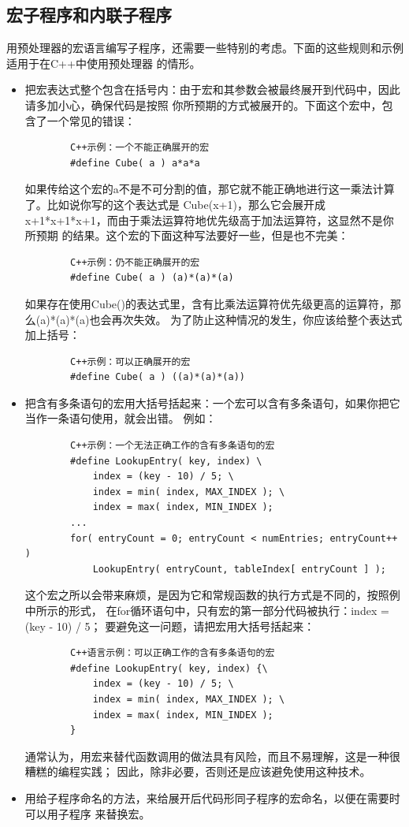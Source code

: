 \documentclass{article}
\begin{document}
\subsection{宏子程序和内联子程序}
用预处理器的宏语言编写子程序，还需要一些特别的考虑。下面的这些规则和示例适用于在C++中使用预处理器
的情形。
\begin{itemize}
    \item 把宏表达式整个包含在括号内：由于宏和其参数会被最终展开到代码中，因此请多加小心，确保代码是按照
    你所预期的方式被展开的。下面这个宏中，包含了一个常见的错误：
    \begin{lstlisting}
        C++示例：一个不能正确展开的宏
        #define Cube( a ) a*a*a
    \end{lstlisting}
    如果传给这个宏的a不是不可分割的值，那它就不能正确地进行这一乘法计算了。比如说你写的这个表达式是
    Cube(x+1)，那么它会展开成x+1*x+1*x+1，而由于乘法运算符地优先级高于加法运算符，这显然不是你所预期
    的结果。这个宏的下面这种写法要好一些，但是也不完美：
    \begin{lstlisting}
        C++示例：仍不能正确展开的宏
        #define Cube( a ) (a)*(a)*(a)
    \end{lstlisting}
    如果存在使用Cube()的表达式里，含有比乘法运算符优先级更高的运算符，那么(a)*(a)*(a)也会再次失效。
    为了防止这种情况的发生，你应该给整个表达式加上括号：
    \begin{lstlisting}
        C++示例：可以正确展开的宏
        #define Cube( a ) ((a)*(a)*(a))
    \end{lstlisting}
    \item 把含有多条语句的宏用大括号括起来：一个宏可以含有多条语句，如果你把它当作一条语句使用，就会出错。
    例如：
    \begin{lstlisting}
        C++示例：一个无法正确工作的含有多条语句的宏
        #define LookupEntry( key, index) \
            index = (key - 10) / 5; \
            index = min( index, MAX_INDEX ); \
            index = max( index, MIN_INDEX );
        ...
        for( entryCount = 0; entryCount < numEntries; entryCount++ )
            LookupEntry( entryCount, tableIndex[ entryCount ] );
    \end{lstlisting}
    这个宏之所以会带来麻烦，是因为它和常规函数的执行方式是不同的，按照例中所示的形式，
    在for循环语句中，只有宏的第一部分代码被执行：index = (key - 10) / 5；
    要避免这一问题，请把宏用大括号括起来：
    \begin{lstlisting}
        C++语言示例：可以正确工作的含有多条语句的宏
        #define LookupEntry( key, index) {\
            index = (key - 10) / 5; \
            index = min( index, MAX_INDEX ); \
            index = max( index, MIN_INDEX );
        }
    \end{lstlisting}
    通常认为，用宏来替代函数调用的做法具有风险，而且不易理解，这是一种很糟糕的编程实践；
    因此，除非必要，否则还是应该避免使用这种技术。
    \item 用给子程序命名的方法，来给展开后代码形同子程序的宏命名，以便在需要时可以用子程序
    来替换宏。
\end{itemize}
\end{document}
